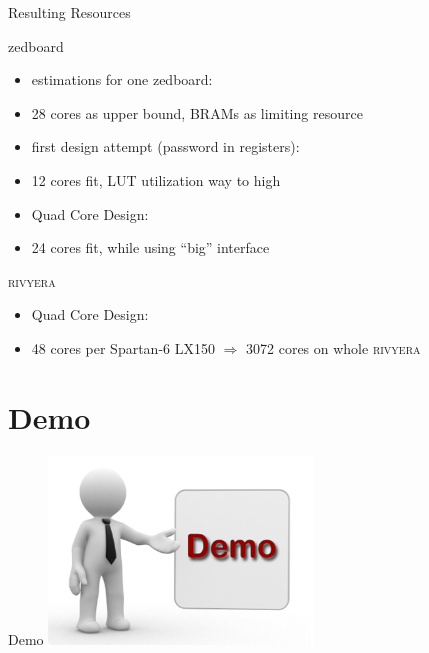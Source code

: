\begin{frame}{Resulting Resources}
    \begin{block}{zedboard}
      \begin{itemize}
          \item estimations for one zedboard:
          \item[] 28 cores as upper bound, BRAMs as limiting resource
          \item first design attempt (password in registers):
          \item[] 12 cores fit, LUT utilization way to high
          \item Quad Core Design:
          \item[] 24 cores fit, while using \enquote{big} interface
      \end{itemize}
    \end{block}
    \begin{block}{\textsc{rivyera}}
      \begin{itemize}
          \item Quad Core Design:
          \item[] 48 cores per Spartan-6 LX150 $\Rightarrow$ 3072 cores on whole \textsc{rivyera}
      \end{itemize}
    \end{block}
\end{frame}

\section{Demo}
\begin{frame}{Demo}
    \center \includegraphics[height=50mm]{data/demo.png}
\end{frame}

